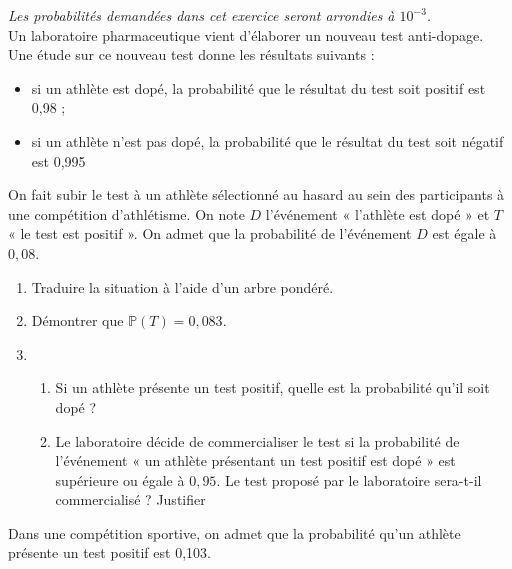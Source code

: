\documentclass[11pt,fleqn, openany]{book} %
\begin{document}
\begin{exercise}[topic=prob13, subtitle={(Amérique du Nord 2021)}]

\textit{Les probabilités demandées dans cet exercice seront arrondies à $10^{-3}$.}\\
Un laboratoire pharmaceutique vient d'élaborer un nouveau test anti-dopage. Une étude sur ce nouveau test donne les résultats suivants :
\begin{itemize}
\item  si un athlète est dopé, la probabilité que le résultat du test soit positif est 0,98 ;
\item si un athlète n'est pas dopé, la probabilité que le résultat du test soit négatif est 0,995
\end{itemize}
On fait subir le test à un athlète sélectionné au hasard au sein des participants à une compétition d'athlétisme. On note $D$ l'événement « l'athlète est dopé » et $T$  « le test est positif ». On admet que la probabilité de
l'événement $D$ est égale à $0,08$.

\begin{enumerate}
\item Traduire la situation à l'aide d'un arbre pondéré.
\item Démontrer que $\mathbb{P}(T)=0,083$.
\item \begin{enumerate}
\item Si un athlète présente un test positif, quelle est la probabilité qu'il soit dopé ?
\item Le laboratoire décide de commercialiser le test si la probabilité de l'événement « un athlète présentant un test positif est dopé » est supérieure ou égale à $0,95$. Le test proposé par le laboratoire sera-t-il commercialisé ? Justifier
\end{enumerate}
\end{enumerate}

Dans une compétition sportive, on admet que la probabilité qu'un athlète présente un test positif est 0,103.


\end{exercise}
\end{document}
